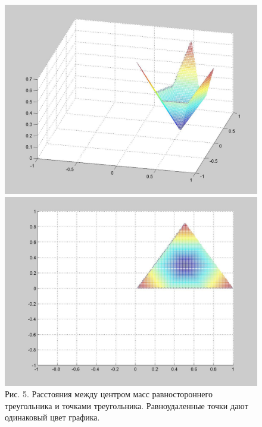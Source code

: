 \documentclass[12pt]{report}
\begin{document}
\begin{figure}[!ht]
\begin{center}
\includegraphics[scale=0.2]{SimplexDists1}
\includegraphics[scale=0.2]{SimplexDists2}
\\Рис. 5. Расстояния между центром масс равностороннего треугольника и точками треугольника. Равноудаленные точки дают одинаковый цвет графика.
\end{center}
\end{figure}
\end{document}
